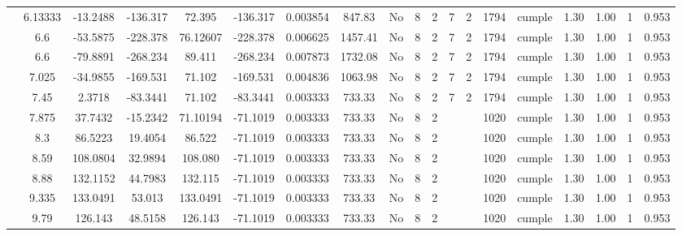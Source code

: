 \begin{table}[H]
{\begin{tabular}{|c|c|c|c|c|c|r|c|c|c|c|c|c|c|c|c|c|c|c|}
\cline{2-19}    & 6.13333 & -13.2488 & -136.317 & 72.395 & -136.317 & 0.003854 & 847.83 & No  & 8   & 2   & 7   & 2   & 1794 & \cellcolor[rgb]{ .776,  .937,  .808}cumple & 1.30 & 1.00 & 1   & 0.953 \bigstrut\\
\cline{2-19}    & 6.6 & -53.5875 & -228.378 & 76.12607 & -228.378 & 0.006625 & 1457.41 & No  & 8   & 2   & 7   & 2   & 1794 & \cellcolor[rgb]{ .776,  .937,  .808}cumple & 1.30 & 1.00 & 1   & 0.953 \bigstrut\\
\cline{2-19}    & 6.6 & -79.8891 & -268.234 & 89.411 & -268.234 & 0.007873 & 1732.08 & No  & 8   & 2   & 7   & 2   & 1794 & \cellcolor[rgb]{ .776,  .937,  .808}cumple & 1.30 & 1.00 & 1   & 0.953 \bigstrut\\
\cline{2-19}    & 7.025 & -34.9855 & -169.531 & 71.102 & -169.531 & 0.004836 & 1063.98 & No  & 8   & 2   & 7   & 2   & 1794 & \cellcolor[rgb]{ .776,  .937,  .808}cumple & 1.30 & 1.00 & 1   & 0.953 \bigstrut\\
\cline{2-19}    & 7.45 & 2.3718 & -83.3441 & 71.102 & -83.3441 & 0.003333 & 733.33 & No  & 8   & 2   & 7   & 2   & 1794 & \cellcolor[rgb]{ .776,  .937,  .808}cumple & 1.30 & 1.00 & 1   & 0.953 \bigstrut\\
\cline{2-19}    & 7.875 & 37.7432 & -15.2342 & 71.10194 & -71.1019 & 0.003333 & 733.33 & No  & 8   & 2   &     &     & 1020 & \cellcolor[rgb]{ .776,  .937,  .808}cumple & 1.30 & 1.00 & 1   & 0.953 \bigstrut\\
\cline{2-19}    & 8.3 & 86.5223 & 19.4054 & 86.522 & -71.1019 & 0.003333 & 733.33 & No  & 8   & 2   &     &     & 1020 & \cellcolor[rgb]{ .776,  .937,  .808}cumple & 1.30 & 1.00 & 1   & 0.953 \bigstrut\\
\cline{2-19}    & 8.59 & 108.0804 & 32.9894 & 108.080 & -71.1019 & 0.003333 & 733.33 & No  & 8   & 2   &     &     & 1020 & \cellcolor[rgb]{ .776,  .937,  .808}cumple & 1.30 & 1.00 & 1   & 0.953 \bigstrut\\
\cline{2-19}    & 8.88 & 132.1152 & 44.7983 & 132.115 & -71.1019 & 0.003333 & 733.33 & No  & 8   & 2   &     &     & 1020 & \cellcolor[rgb]{ .776,  .937,  .808}cumple & 1.30 & 1.00 & 1   & 0.953 \bigstrut\\
\cline{2-19}    & 9.335 & 133.0491 & 53.013 & 133.0491 & -71.1019 & 0.003333 & 733.33 & No  & 8   & 2   &     &     & 1020 & \cellcolor[rgb]{ .776,  .937,  .808}cumple & 1.30 & 1.00 & 1   & 0.953 \bigstrut\\
\cline{2-19}    & 9.79 & 126.143 & 48.5158 & 126.143 & -71.1019 & 0.003333 & 733.33 & No  & 8   & 2   &     &     & 1020 & \cellcolor[rgb]{ .776,  .937,  .808}cumple & 1.30 & 1.00 & 1   & 0.953 \bigstrut\\

\end{tabular}}
\end{table}
